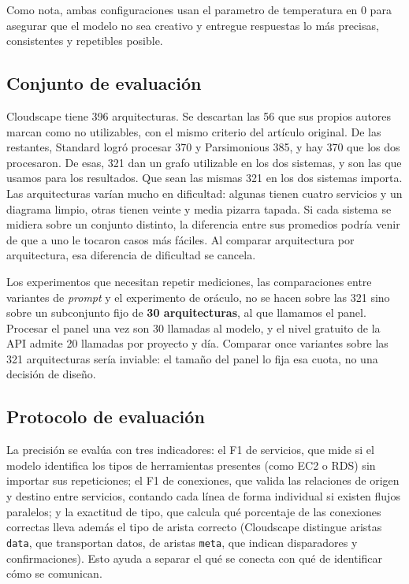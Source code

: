 \documentclass[a4paper, twocolumn, 10pt]{IEEEtran}
\begin{document}
Como nota, ambas configuraciones usan el parametro de temperatura en 0 para asegurar que el modelo no sea creativo y entregue respuestas lo más precisas, consistentes y repetibles posible.
 
\subsection{Conjunto de evaluación}
Cloudscape tiene 396 arquitecturas. Se descartan las 56 que sus propios autores marcan como no utilizables, con el mismo criterio del artículo original. De las restantes, Standard logró procesar 370 y Parsimonious 385, y hay 370 que los dos procesaron. De esas, 321 dan un grafo utilizable en los dos sistemas, y son las que usamos para los resultados. Que sean las mismas 321 en los dos sistemas importa. Las arquitecturas varían mucho en dificultad: algunas tienen cuatro servicios y un diagrama limpio, otras tienen veinte y media pizarra tapada. Si cada sistema se midiera sobre un conjunto distinto, la diferencia entre sus promedios podría venir de que a uno le tocaron casos más fáciles. Al comparar arquitectura por arquitectura, esa diferencia de dificultad se cancela.
 
Los experimentos que necesitan repetir mediciones, las comparaciones entre variantes de \emph{prompt} y el experimento de oráculo, no se hacen sobre las 321 sino sobre un subconjunto fijo de \textbf{30 arquitecturas}, al que llamamos el panel. Procesar el panel una vez son 30 llamadas al modelo, y el nivel gratuito de la API admite 20 llamadas por proyecto y día. Comparar once variantes sobre las 321 arquitecturas sería inviable: el tamaño del panel lo fija esa cuota, no una decisión de diseño.
 
\subsection{Protocolo de evaluación}
La precisión se evalúa con tres indicadores: el F1 de servicios, que mide si el modelo identifica los tipos de herramientas presentes (como EC2 o RDS) sin importar sus repeticiones; el F1 de conexiones, que valida las relaciones de origen y destino entre servicios, contando cada línea de forma individual si existen flujos paralelos; y la exactitud de tipo, que calcula qué porcentaje de las conexiones correctas lleva además el tipo de arista correcto (Cloudscape distingue aristas \texttt{data}, que transportan datos, de aristas \texttt{meta}, que indican disparadores y confirmaciones). Esto ayuda a separar el qué se conecta con qué de identificar cómo se comunican.
 
\end{document}
